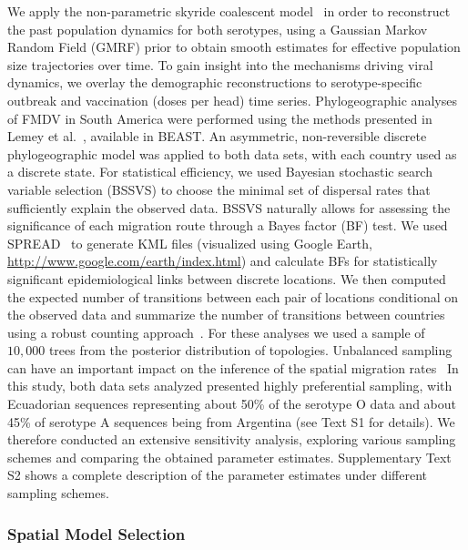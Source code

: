 \documentclass[10pt]{article}
\begin{document}
We apply the non-parametric skyride coalescent model~\cite{skyride} in order to reconstruct the past population dynamics for both serotypes, using a Gaussian Markov Random Field (GMRF) prior to obtain smooth estimates for effective population size trajectories over time.
To gain insight into the mechanisms driving viral dynamics, we overlay the demographic reconstructions to serotype-specific outbreak and vaccination (doses per head) time series.
Phylogeographic analyses of FMDV in South America were performed using the methods presented in Lemey et al.~\cite{roots}, available in BEAST. 
An asymmetric, non-reversible discrete phylogeographic model was applied to both data sets, with each country used as a discrete state.
For statistical efficiency, we used Bayesian stochastic search variable selection (BSSVS) to choose the minimal set of dispersal rates that sufficiently explain the observed data.
BSSVS naturally allows for assessing the significance of each migration route through a Bayes factor (BF) test.
We used SPREAD~\cite{spread} to generate KML files (visualized using Google Earth, \url{http://www.google.com/earth/index.html}) and calculate BFs for statistically significant epidemiological links between discrete locations.
We then computed the expected number of transitions between each pair of locations conditional on the observed data and summarize the number of transitions between countries using a robust counting approach~\cite{Minin2008}.
For these analyses we used a sample of $10,000$ trees from the posterior distribution of topologies.
Unbalanced sampling can have an important impact on the inference of the spatial migration rates~\cite{Faria2012, Lemey2014, Frost2014}
In this study, both data sets analyzed presented highly preferential sampling, with Ecuadorian sequences representing about 50\% of the serotype O data and about 45\% of serotype A sequences being from Argentina (see Text S1 for details).
We therefore conducted an extensive sensitivity analysis, exploring various sampling schemes and comparing the obtained parameter estimates.
Supplementary Text S2 shows a complete description of the parameter estimates under different sampling schemes. 

\subsubsection*{Spatial Model Selection}
\end{document}
